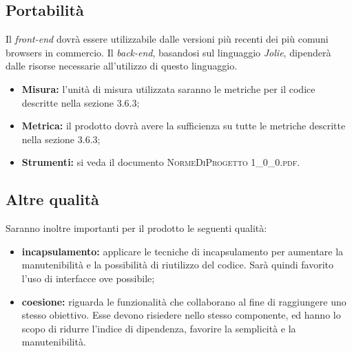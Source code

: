	\subsection{Portabilità}
		Il \textit{front-end} dovrà essere utilizzabile dalle versioni più recenti dei più comuni browsers in commercio. 
		Il \textit{back-end}, basandosi sul linguaggio \textit{Jolie}, dipenderà dalle risorse necessarie all’utilizzo di questo linguaggio.
		
		\begin{itemize}
			\item \textbf{Misura: }l’unità di misura utilizzata saranno le metriche per il codice descritte nella sezione 3.6.3;
			\item \textbf{Metrica: }il prodotto dovrà avere la sufficienza su tutte le metriche descritte nella sezione 3.6.3;
			\item \textbf{Strumenti: }si veda il documento \textsc{NormeDiProgetto 1\_0\_0.pdf}.
			
		\end{itemize}
	
	\subsection{Altre qualità}
		Saranno inoltre importanti per il prodotto le seguenti qualità:
		
		\begin{itemize}
			\item \textbf{incapsulamento: }applicare le tecniche di incapsulamento per aumentare la manutenibilità
			e la possibilità di riutilizzo del codice. Sarà quindi favorito l’uso di interfacce ove
			possibile;
			\item \textbf{coesione: }riguarda le funzionalità che collaborano al fine di raggiungere uno stesso obiettivo. Esse devono risiedere nello stesso componente, ed hanno lo scopo di ridurre l’indice di dipendenza, favorire la semplicità e la manutenibilità.
			
		\end{itemize}
		
	
	
	